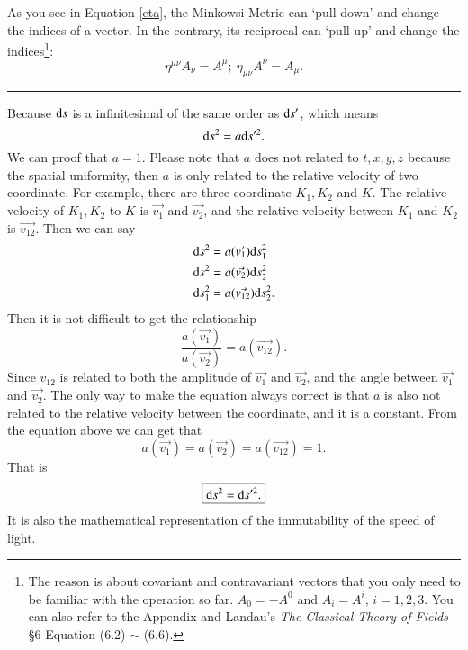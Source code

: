 \documentclass[openany,10pt]{book}
\theoremstyle{definition}
\theoremstyle{definition}
\theoremstyle{remark}
\begin{document}
As you see in Equation \ref{eta},  the Minkowsi Metric can `pull down' and change the indices of a vector. In the contrary, its reciprocal can `pull up' and change the indices\footnote{The reason is about covariant and contravariant vectors that you only need to be familiar with the operation so far. $A_0=-A^0$ and $A_i=A^i$, $i=1,2,3$. You can also refer to the Appendix and Landau's \textit{The Classical Theory of Fields} \S6 Equation (6.2) $\sim$ (6.6).}:
\begin{equation}
    \eta^{\mu\nu}A_\nu=A^\mu;\ \eta_{\mu\nu}A^\nu=A_\mu.
\end{equation}
\rule{\textwidth}{0.3mm}

Because ${\rm d}s$ is a infinitesimal of the same order as ${\rm d}s'$, which means
\begin{equation}
{\rm d}s^2=a {\rm d}s'^2.
\end{equation}
We can proof that $a=1$. Please note that $a$ does not related to $t,x,y,z$  because the spatial uniformity, then $a$ is only related to the relative velocity of two coordinate. For example, there are three coordinate $K_1, K_2$ and $K$. The relative velocity of  $K_1, K_2$ to $K$ is $\vec{v_1}$ and $\vec{v_2}$, and the relative velocity between $K_1$ and $K_2$ is $\vec{v_{12}}$. Then we can say 
\begin{equation}
\begin{aligned}
{\rm{d}}s^2&=a(\vec{v_1}){\rm{d}}s_1^2\\
{\rm{d}}s^2&=a(\vec{v_2}){\rm{d}}s_2^2\\
{\rm{d}}s_1^2&=a(\vec{v_{12}}){\rm{d}}s_2^2.
\end{aligned}
\end{equation}
Then it is not difficult to get the relationship 
\begin{equation}
\frac{a(\vec{v_1})}{a(\vec{v_2})}=a(\vec{v_{12}}).
\end{equation}
Since $v_{12}$ is related to both the amplitude of $\vec{v_1}$ and $\vec{v_2}$, and the angle between $\vec{v_1}$ and $\vec{v_2}$. The only way to make the equation always correct is that $a$ is also not related to the relative velocity between the coordinate, and it is a constant. From the equation above we can get that 
\begin{equation}
a(\vec{v_1})=a(\vec{v_2})=a(\vec{v_{12}})=1.
\end{equation}
That is 
\begin{equation}
\boxed{{\rm{d}}s^2={\rm{d}}s'^2.}
\end{equation}
It is also the mathematical representation of the immutability of the speed of light. 
\end{document}

